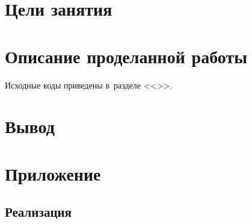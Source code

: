 

\graphicspath{{./images/}}






  
  \setcounter{page}{2}

  \tableofcontents
  \newpage

  \section{Цели занятия}

  \section{Описание проделанной работы}

    Исходные коды приведены в~разделе <<>>.

  \section{Вывод}

  \newpage

  \section{Приложение} \label{sec:addon}

    \subsection{Реализация}



